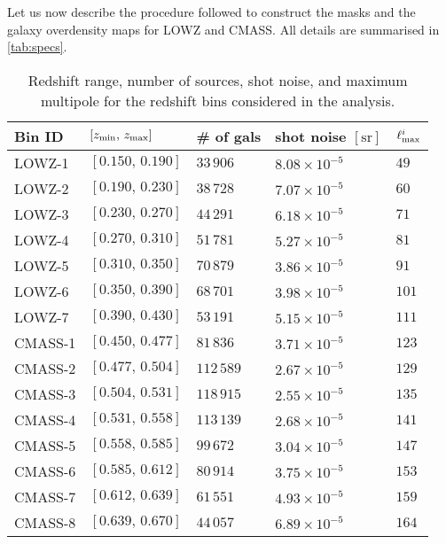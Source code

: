 \documentclass[astrosymb,twocolumn]{aastex631}
\begin{document}
Let us now describe the procedure followed to construct the masks and the galaxy overdensity maps for LOWZ and CMASS. All details are summarised in \autoref{tab:specs}.
\begin{table}
\centering
\caption{Redshift range, number of sources, shot noise, and maximum multipole for the redshift bins considered in the analysis.}
\setlength{\tabcolsep}{4.5pt}
\renewcommand{\arraystretch}{1.1}
 \begin{tabularx}{\columnwidth}{l l l l X}
 \hline
 Bin ID &  \([z_{\rm min},\, z_{\rm max}]\) & \# of gals  & shot noise \(\mathrm{[sr]}\) & \(\ell_{\rm max}^i\) \\  
\hline
 LOWZ-1 & \([0.150,\, 0.190]\) & \(33\,906\) & \(8.08\times10^{-5}\) & \(49\) \\
 LOWZ-2 & \([0.190,\, 0.230]\) & \(38\,728\) & \(7.07\times10^{-5}\) & \(60\) \\ 
 LOWZ-3 & \([0.230,\, 0.270]\) & \(44\,291\) & \(6.18\times10^{-5}\) & \(71\) \\
 LOWZ-4 & \([0.270,\, 0.310]\) & \(51\,781\) & \(5.27\times10^{-5}\) & \(81\) \\
 LOWZ-5 & \([0.310,\, 0.350]\) & \(70\,879\) & \(3.86\times10^{-5}\) & \(91\) \\
 LOWZ-6 & \([0.350,\, 0.390]\) & \(68\,701\) & \(3.98\times10^{-5}\) & \(101\) \\
 LOWZ-7 & \([0.390,\, 0.430]\) & \(53\,191\) & \(5.15\times10^{-5}\) & \(111\) \\
 CMASS-1 & \([0.450,\, 0.477]\) & \(81\,836\) & \(3.71\times10^{-5}\) & \(123\) \\ 
 CMASS-2 & \([0.477,\, 0.504]\) & \(112\,589\) & \(2.67\times10^{-5}\) & \(129\) \\ 
 CMASS-3 & \([0.504,\, 0.531]\) & \(118\,915\) & \(2.55\times10^{-5}\) & \(135\) \\
 CMASS-4 & \([0.531,\, 0.558]\) & \(113\,139\) & \(2.68\times10^{-5}\) & \(141\) \\
 CMASS-5 & \([0.558,\, 0.585]\) & \(99\,672\) & \(3.04\times10^{-5}\) & \(147\) \\
 CMASS-6 & \([0.585,\, 0.612]\) & \(80\,914\) & \(3.75\times10^{-5}\) & \(153\) \\
 CMASS-7 & \([0.612,\, 0.639]\) & \(61\,551\) & \(4.93\times10^{-5}\) & \(159\) \\
 CMASS-8 & \([0.639,\, 0.670]\) & \(44\,057\) & \(6.89\times10^{-5}\) & \(164\) \\
 \hline
\end{tabularx}
\label{tab:specs}
\end{table}
\end{document}
